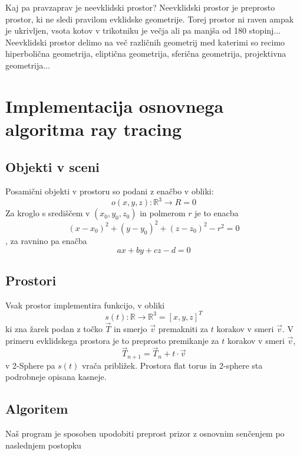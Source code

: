 \documentclass[titlepage]{article}
\begin{document}
Kaj pa pravzaprav je neevklidski prostor?
Neevklidski prostor je preprosto prostor, ki ne sledi pravilom evklidske geometrije. Torej prostor ni raven ampak je ukrivljen, vsota kotov v trikotniku je večja ali pa manjša od 180 stopinj... Neevklidski prostor delimo na več različnih geometrij med katerimi so recimo hiperbolična geometrija, eliptična geometrija, sferična geometrija, projektivna geometrija...

\section{Implementacija osnovnega algoritma ray tracing}
\subsection{Objekti v sceni}
Posamični objekti v prostoru so podani z enačbo v obliki:
\[ o(x,y,z): \mathbb{R}^3 \to R =0 \]
Za kroglo s središčem v $(x_{0}, y_{0}, z_{0})$ in polmerom $r$ je to enacba
\[(x-x_{0})^{2}+(y-y_{0})^{2}+(z-z_{0})^{2}-r^{2}=0 \],
za ravnino pa enačba 
\[ ax+by+cz-d = 0 \]

\subsection{Prostori}
Vsak prostor implementira funkcijo, v obliki
\[ s(t): \mathbb{R} \to \mathbb{R}^3 = [x, y, z]^T \]
ki zna žarek podan z točko \(\vec{T}\) in smerjo \(\vec{v}\) premakniti za \(t\) korakov v smeri \(\vec{v}\).
V primeru evklidskega prostora je to preprosto premikanje za \(t\) korakov v smeri \(\vec{v}\), 
\[ \vec{T}_{n+1} = \vec{T}_{n} + t \cdot \vec{v} \]
v 2-Sphere pa $s(t)$ vrača približek. Prostora flat torus in 2-sphere sta podrobneje opisana kasneje.

\subsection{Algoritem}
Naš program je sposoben upodobiti preprost prizor z osnovnim senčenjem
po naslednjem postopku
\end{document}

